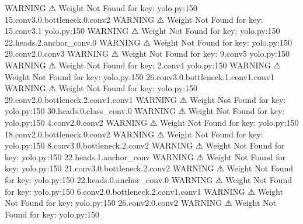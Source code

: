                     WARNING  ⚠ Weight Not Found for key:               yolo.py:150
                             15.conv3.0.bottleneck.0.conv2                        
                    WARNING  ⚠ Weight Not Found for key: 15.conv3.1    yolo.py:150
                    WARNING  ⚠ Weight Not Found for key:               yolo.py:150
                             22.heads.2.anchor_conv.0                             
                    WARNING  ⚠ Weight Not Found for key:               yolo.py:150
                             29.conv2.0.conv3                                     
                    WARNING  ⚠ Weight Not Found for key: 9.conv5       yolo.py:150
                    WARNING  ⚠ Weight Not Found for key: 2.conv4       yolo.py:150
                    WARNING  ⚠ Weight Not Found for key:               yolo.py:150
                             26.conv3.0.bottleneck.1.conv1.conv1                  
                    WARNING  ⚠ Weight Not Found for key:               yolo.py:150
                             29.conv2.0.bottleneck.2.conv1.conv1                  
                    WARNING  ⚠ Weight Not Found for key:               yolo.py:150
                             30.heads.0.class_conv.0                              
                    WARNING  ⚠ Weight Not Found for key:               yolo.py:150
                             4.conv2.0.conv2                                      
                    WARNING  ⚠ Weight Not Found for key:               yolo.py:150
                             18.conv2.0.bottleneck.0.conv2                        
                    WARNING  ⚠ Weight Not Found for key:               yolo.py:150
                             8.conv3.0.bottleneck.2.conv2                         
                    WARNING  ⚠ Weight Not Found for key:               yolo.py:150
                             22.heads.1.anchor_conv                               
                    WARNING  ⚠ Weight Not Found for key:               yolo.py:150
                             21.conv3.0.bottleneck.2.conv2                        
                    WARNING  ⚠ Weight Not Found for key:               yolo.py:150
                             22.heads.0.anchor_conv.0                             
                    WARNING  ⚠ Weight Not Found for key:               yolo.py:150
                             6.conv2.0.bottleneck.2.conv1.conv1                   
                    WARNING  ⚠ Weight Not Found for key:               yolo.py:150
                             26.conv2.0.conv2                                     
                    WARNING  ⚠ Weight Not Found for key:               yolo.py:150
